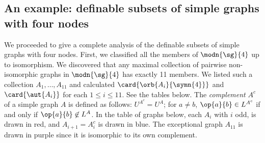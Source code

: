 \subsection{An example: definable subsets of simple graphs with four nodes}

We proceeded to give a complete analysis of the definable subsets of simple graphs with four nodes. First, we classified all the members of $\modn{\sg}{4}$ up to isomorphism. We discovered that any maximal collection of pairwise non-isomorphic graphs in $\modn{\sg}{4}$ has exactly 11 members. We listed such a collection $A_1,\ldots,A_{11}$ and calculated $\card{\orb{A_i}{\symn{4}}}$ and $\card{\aut{A_i}}$ for each $1\leq i\leq 11$. See the tables below. The \emph{complement} $A^c$ of a simple graph $A$ is defined as follows: $U^{A^c}=U^A$; for $a\neq b$, $\op{a}{b}\in L^{A^c}$ if and only if $\op{a}{b}\not\in L^{A}$. In the table of graphs below, each $A_i$ with $i$ odd, is drawn in red, and $A_{i+1} = A_i^c$ is drawn in blue. The exceptional graph $A_{11}$ is drawn in purple since it is isomorphic to its own complement. 


